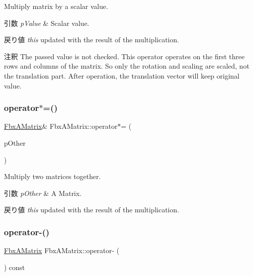 Multiply matrix by a scalar value. 
\begin{DoxyParams}{引数}
{\em p\+Value} & Scalar value. \\
\hline
\end{DoxyParams}
\begin{DoxyReturn}{戻り値}
{\itshape this} updated with the result of the multiplication. 
\end{DoxyReturn}
\begin{DoxyRemark}{注釈}
The passed value is not checked. This operator operates on the first three rows and columns of the matrix. So only the rotation and scaling are scaled, not the translation part. After operation, the translation vector will keep original value. 
\end{DoxyRemark}
\mbox{\label{class_fbx_a_matrix_a8eba4c43ccc466bebfc555c9170bf3e5}} 
\subsubsection{\texorpdfstring{operator$\ast$=()}{operator*=()}\hspace{0.1cm}{\footnotesize\ttfamily [2/2]}}
{\footnotesize\ttfamily \hyperlink{class_fbx_a_matrix}{Fbx\+A\+Matrix}\& Fbx\+A\+Matrix\+::operator$\ast$= (\begin{DoxyParamCaption}\item[{const \hyperlink{class_fbx_a_matrix}{Fbx\+A\+Matrix} \&}]{p\+Other }\end{DoxyParamCaption})}

Multiply two matrices together. 
\begin{DoxyParams}{引数}
{\em p\+Other} & A Matrix. \\
\hline
\end{DoxyParams}
\begin{DoxyReturn}{戻り値}
{\itshape this} updated with the result of the multiplication. 
\end{DoxyReturn}
\mbox{\label{class_fbx_a_matrix_a8f8ab0b3698f9d25b3051c5928315ef6}} 
\subsubsection{\texorpdfstring{operator-\/()}{operator-()}}
{\footnotesize\ttfamily \hyperlink{class_fbx_a_matrix}{Fbx\+A\+Matrix} Fbx\+A\+Matrix\+::operator-\/ (\begin{DoxyParamCaption}{ }\end{DoxyParamCaption}) const}

